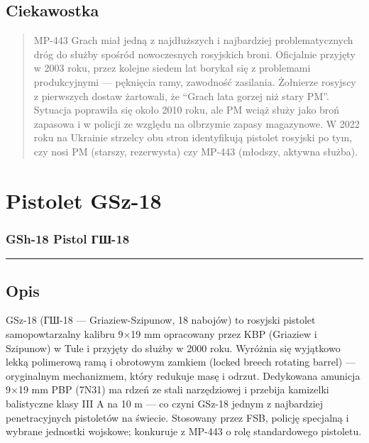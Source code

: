 \documentclass[12pt,openany,oneside]{book}
\begin{document}
\section{Ciekawostka}\label{ciekawostka-91}

\begin{quote}
MP-443 Grach miał jedną z najdłuższych i najbardziej problematycznych
dróg do służby spośród nowoczesnych rosyjskich broni. Oficjalnie
przyjęty w 2003 roku, przez kolejne siedem lat borykał się z problemami
produkcyjnymi --- pęknięcia ramy, zawodność zasilania. Żołnierze
rosyjscy z pierwszych dostaw żartowali, że ``Grach lata gorzej niż stary
PM''. Sytuacja poprawiła się około 2010 roku, ale PM wciąż służy jako
broń zapasowa i w policji ze względu na olbrzymie zapasy magazynowe. W
2022 roku na Ukrainie strzelcy obu stron identyfikują pistolet rosyjski
po tym, czy nosi PM (starszy, rezerwysta) czy MP-443 (młodszy, aktywna
służba).
\end{quote}

\chapter{Pistolet GSz-18}\label{pistolet-gsz-18}

\subsection{GSh-18 Pistol \textbar{}
ГШ-18}\label{gsh-18-pistol-ux433ux448-18}

\begin{center}\rule{0.5\linewidth}{0.5pt}\end{center}

\section{Opis}\label{opis-92}

GSz-18 (ГШ-18 --- Griaziew-Szipunow, 18 nabojów) to rosyjski pistolet
samopowtarzalny kalibru 9×19 mm opracowany przez KBP (Griaziew i
Szipunow) w Tule i przyjęty do służby w 2000 roku. Wyróżnia się
wyjątkowo lekką polimerową ramą i obrotowym zamkiem (locked breech
rotating barrel) --- oryginalnym mechanizmem, który redukuje masę i
odrzut. Dedykowana amunicja 9×19 mm PBP (7N31) ma rdzeń ze stali
narzędziowej i przebija kamizelki balistyczne klasy III A na 10 m --- co
czyni GSz-18 jednym z najbardziej penetracyjnych pistoletów na świecie.
Stosowany przez FSB, policję specjalną i wybrane jednostki wojskowe;
konkuruje z MP-443 o rolę standardowego pistoletu.
\end{document}
